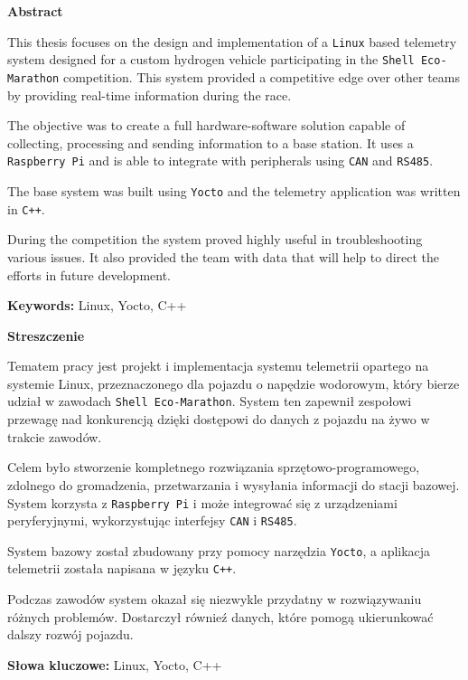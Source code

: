 {\Large \textbf{Abstract}}

This thesis focuses on the design and implementation of a \verb|Linux| based telemetry
system designed for a custom hydrogen vehicle participating in the \verb|Shell Eco-Marathon| competition.
This system provided a competitive edge over other teams by providing real-time information during the race.

The objective was to create a full hardware-software solution capable of collecting, processing and sending
information to a base station. It uses a \verb|Raspberry Pi| and is able to integrate with peripherals
using \verb|CAN| and \verb|RS485|.

The base system was built using \verb|Yocto| and the telemetry application was written in \verb|C++|.

During the competition the system proved highly useful in troubleshooting various issues. It also provided
the team with data that will help to direct the efforts in future development.

\textbf{Keywords:} Linux, Yocto, C++

\vspace{1cm}

{\Large \textbf{Streszczenie}}

Tematem pracy jest projekt i implementacja systemu telemetrii opartego na systemie Linux,
przeznaczonego dla pojazdu o napędzie wodorowym, który bierze udział w zawodach \verb|Shell Eco-Marathon|.
System ten zapewnił zespołowi przewagę nad konkurencją dzięki dostępowi do danych z pojazdu na żywo w trakcie zawodów.

Celem było stworzenie kompletnego rozwiązania sprzętowo-programowego, zdolnego do gromadzenia, przetwarzania i wysyłania
informacji do stacji bazowej. System korzysta z \verb|Raspberry Pi| i może integrować się z urządzeniami peryferyjnymi,
wykorzystując interfejsy \verb|CAN| i \verb|RS485|.

System bazowy został zbudowany przy pomocy narzędzia \verb|Yocto|, a aplikacja telemetrii została napisana
w języku \verb|C++|.

Podczas zawodów system okazał się niezwykle przydatny w rozwiązywaniu różnych problemów.
Dostarczył równieź danych, które pomogą ukierunkować dalszy rozwój pojazdu.

\textbf{Słowa kluczowe:} Linux, Yocto, C++
